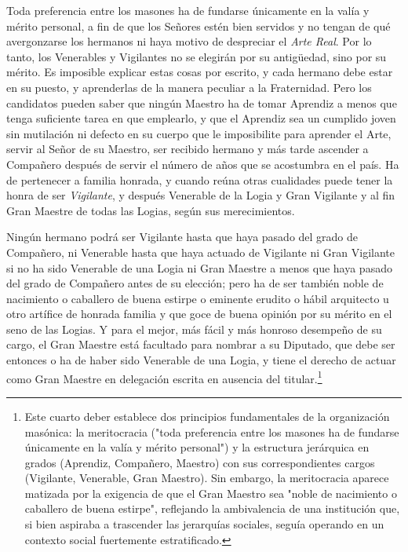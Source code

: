 \documentclass[a4paper,12pt,twoside]{book}
\begin{document}
\noindent Toda preferencia entre los masones ha de fundarse únicamente en la valía y mérito personal, a fin de que los Señores estén bien servidos y no tengan de qué avergonzarse los hermanos ni haya motivo de despreciar el \textit{Arte Real}. Por lo tanto, los Venerables y Vigilantes no se elegirán por su antigüedad, sino por su mérito. Es imposible explicar estas cosas por escrito, y cada hermano debe estar en su puesto, y aprenderlas de la manera peculiar a la Fraternidad. Pero los candidatos pueden saber que ningún Maestro ha de tomar Aprendiz a menos que tenga suficiente tarea en que emplearlo, y que el Aprendiz sea un cumplido joven sin mutilación ni defecto en su cuerpo que le imposibilite para aprender el Arte, servir al Señor de su Maestro, ser recibido hermano y más tarde ascender a Compañero después de servir el número de años que se acostumbra en el país. Ha de pertenecer a familia honrada, y cuando reúna otras cualidades puede tener la honra de ser \textit{Vigilante}, y después Venerable de la Logia y Gran Vigilante y al fin Gran Maestre de todas las Logias, según sus merecimientos.

\noindent Ningún hermano podrá ser Vigilante hasta que haya pasado del grado de Compañero, ni Venerable hasta que haya actuado de Vigilante ni Gran Vigilante si no ha sido Venerable de una Logia ni Gran Maestre a menos que haya pasado del grado de Compañero antes de su elección; pero ha de ser también noble de nacimiento o caballero de buena estirpe o eminente erudito o hábil arquitecto u otro artífice de honrada familia y que goce de buena opinión por su mérito en el seno de las Logias. Y para el mejor, más fácil y más honroso desempeño de su cargo, el Gran Maestre está facultado para nombrar a su Diputado, que debe ser entonces o ha de haber sido Venerable de una Logia, y tiene el derecho de actuar como Gran Maestre en delegación escrita en ausencia del titular.\footnote{Este cuarto deber establece dos principios fundamentales de la organización masónica: la meritocracia ("toda preferencia entre los masones ha de fundarse únicamente en la valía y mérito personal") y la estructura jerárquica en grados (Aprendiz, Compañero, Maestro) con sus correspondientes cargos (Vigilante, Venerable, Gran Maestro). Sin embargo, la meritocracia aparece matizada por la exigencia de que el Gran Maestro sea "noble de nacimiento o caballero de buena estirpe", reflejando la ambivalencia de una institución que, si bien aspiraba a trascender las jerarquías sociales, seguía operando en un contexto social fuertemente estratificado.}
\end{document}
